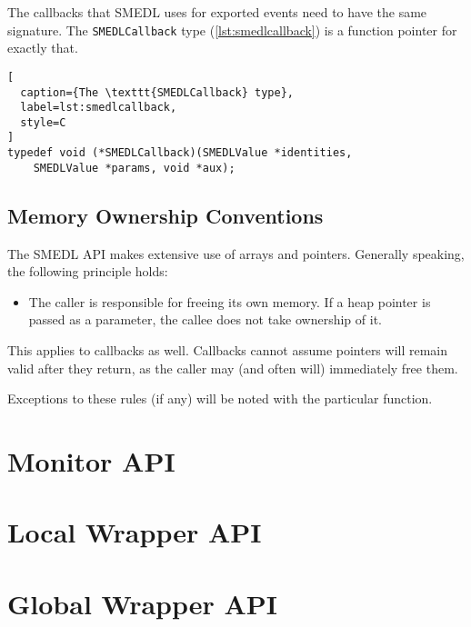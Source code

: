 \documentclass[paper=letter,titlepage,captions=tableheading]{scrartcl}
\begin{document}
The callbacks that SMEDL uses for exported events need to have the same
signature. The \texttt{SMEDLCallback} type (\autoref{lst:smedlcallback}) is a
function pointer for exactly that.

\begin{lstlisting}[
  caption={The \texttt{SMEDLCallback} type},
  label=lst:smedlcallback,
  style=C
]
typedef void (*SMEDLCallback)(SMEDLValue *identities,
    SMEDLValue *params, void *aux);
\end{lstlisting}

\subsection{Memory Ownership Conventions}
\label{subsec:mem-ownership}

The SMEDL API makes extensive use of arrays and pointers. Generally speaking,
the following principle holds:

\begin{itemize}
  \item The caller is responsible for freeing its own memory. If a heap pointer
is passed as a parameter, the callee does not take ownership of it.
\end{itemize}

This applies to callbacks as well. Callbacks cannot assume pointers will remain
valid after they return, as the caller may (and often will) immediately free
them.

Exceptions to these rules (if any) will be noted with the particular function.

\section{Monitor API}
\label{sec:mon}


\section{Local Wrapper API}
\label{sec:local}


\section{Global Wrapper API}
\label{sec:global}

\end{document}
